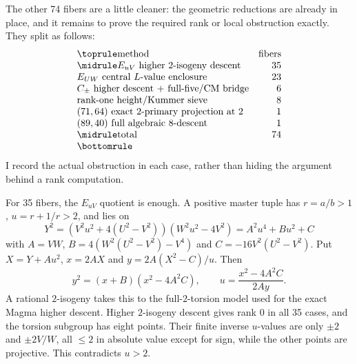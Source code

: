 \documentclass[11pt,a4paper]{amsart}
\begin{document}
The other 74 fibers are a little cleaner: the geometric reductions are already in place, and it remains to prove the required rank or local obstruction exactly. They split as follows:
\begin{equation}\label{eq:seventy-four}
\begin{array}{lr}
\toprule
\text{method} & \text{fibers}\\
\midrule
E_{uV}\text{ higher }2\text{-isogeny descent} &35\\
E_{UW}\text{ central }L\text{-value enclosure} &23\\
C_\pm\text{ higher descent + full-five/CM bridge} &6\\
\text{rank-one height/Kummer sieve} &8\\
(71,64)\text{ exact }2\text{-primary projection at }2 &1\\
(89,40)\text{ full algebraic }8\text{-descent} &1\\
\midrule
\text{total} &74\\
\bottomrule
\end{array}
\end{equation}
I record the actual obstruction in each case, rather than hiding the argument behind a rank computation.

For 35 fibers, the $E_{uV}$ quotient is enough. A positive master tuple has $r=a/b>1$, $u=r+1/r>2$, and lies on
\[
Y^2=(V^2u^2+4(U^2-V^2))(W^2u^2-4V^2)=A^2u^4+Bu^2+C
\]
with $A=VW$, $B=4(W^2(U^2-V^2)-V^4)$ and $C=-16V^2(U^2-V^2)$. Put $X=Y+Au^2$, $x=2AX$ and $y=2A(X^2-C)/u$. Then
\begin{equation}\label{eq:euv-map}
y^2=(x+B)(x^2-4A^2C),\qquad u=\frac{x^2-4A^2C}{2Ay}.
\end{equation}
A rational $2$-isogeny takes this to the full-$2$-torsion model used for the exact Magma higher descent. Higher $2$-isogeny descent gives rank $0$ in all 35 cases, and the torsion subgroup has eight points. Their finite inverse $u$-values are only $\pm2$ and $\pm2V/W$, all $\le2$ in absolute value except for sign, while the other points are projective. This contradicts $u>2$.
\end{document}
